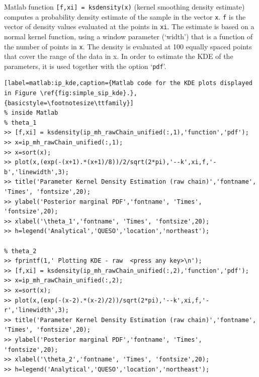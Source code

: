 Matlab function \verb+[f,xi] = ksdensity(x)+ (kernel smoothing density estimate) computes a probability density estimate of the sample in the vector \texttt{x}. \texttt{f} is the vector of density values evaluated at the points in \texttt{xi}. The estimate is based on a normal kernel function, using a window parameter (`width') that is a function of the number of points in \texttt{x}. The density is evaluated at 100 equally spaced points that cover the range of the data in x.  In order to estimate the KDE of the parameters, it is used together with the option `\verb+pdf+'. 

\begin{lstlisting}[label=matlab:ip_kde,caption={Matlab code for the KDE plots displayed in Figure \ref{fig:simple_sip_kde}.},{basicstyle=\footnotesize\ttfamily}]
% inside Matlab
% theta_1
>> [f,xi] = ksdensity(ip_mh_rawChain_unified(:,1),'function','pdf');
>> x=ip_mh_rawChain_unified(:,1);
>> x=sort(x);
>> plot(x,(exp(-(x+1).*(x+1)/8))/2/sqrt(2*pi),'--k',xi,f,'-b','linewidth',3);
>> title('Parameter Kernel Density Estimation (raw chain)','fontname', 'Times', 'fontsize',20);
>> ylabel('Posterior marginal PDF','fontname', 'Times', 'fontsize',20);
>> xlabel('\theta_1','fontname', 'Times', 'fontsize',20);
>> h=legend('Analytical','QUESO','location','northeast');

% theta_2
>> fprintf(1,' Plotting KDE - raw  <press any key>\n');
>> [f,xi] = ksdensity(ip_mh_rawChain_unified(:,2),'function','pdf');
>> x=ip_mh_rawChain_unified(:,2);
>> x=sort(x);
>> plot(x,(exp(-(x-2).*(x-2)/2))/sqrt(2*pi),'--k',xi,f,'-r','linewidth',3);
>> title('Parameter Kernel Density Estimation (raw chain)','fontname', 'Times', 'fontsize',20);
>> ylabel('Posterior marginal PDF','fontname', 'Times', 'fontsize',20);
>> xlabel('\theta_2','fontname', 'Times', 'fontsize',20);
>> h=legend('Analytical','QUESO','location','northeast');
\end{lstlisting}

